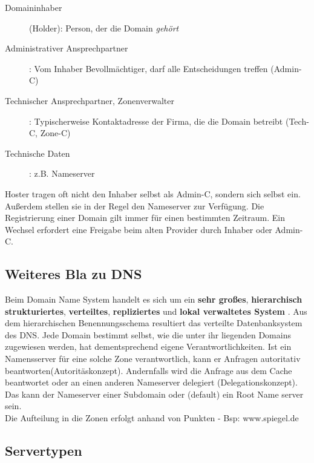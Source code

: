 \documentclass{article} %
\begin{document}
\begin{description}
	\item[Domaininhaber](Holder): Person, der die Domain \emph{gehört}
	\item[Administrativer Ansprechpartner]: Vom Inhaber Bevollmächtiger, darf alle Entscheidungen treffen (Admin-C)
	\item[Technischer Ansprechpartner, Zonenverwalter]: Typischerweise Kontaktadresse der Firma, die die Domain betreibt (Tech-C, Zone-C)
	\item [Technische Daten]: z.B. Nameserver
\end{description}

Hoster tragen oft nicht den Inhaber selbst als Admin-C, sondern sich selbst ein.
Außerdem stellen sie in der Regel den Nameserver zur Verfügung.
Die Registrierung einer Domain gilt immer für einen bestimmten Zeitraum.
Ein Wechsel erfordert eine Freigabe beim alten Provider durch Inhaber oder Admin-C.

\subsection{Weiteres Bla zu DNS}

Beim Domain Name System handelt es sich um ein \textbf{sehr großes}, \textbf{hierarchisch strukturiertes}, \textbf{verteiltes}, \textbf{repliziertes} und \textbf{lokal verwaltetes System} \cite{rfc1034,rfc1035}.
Aus dem hierarchischen Benennungsschema resultiert das verteilte Datenbanksystem des DNS.
Jede Domain bestimmt selbst, wie die unter ihr liegenden Domains zugewiesen werden, hat dementsprechend eigene Verantwortlichkeiten.
Ist ein Namensserver für eine solche Zone verantwortlich, kann er Anfragen autoritativ beantworten(Autoritäskonzept).
Andernfalls wird die Anfrage aus dem Cache beantwortet oder an einen anderen Nameserver delegiert (Delegationskonzept).
Das kann der Nameserver einer Subdomain oder (default) ein Root Name server sein.\\
Die Aufteilung in die Zonen erfolgt anhand von Punkten - Bsp: www.spiegel.de

\subsection{Servertypen}
\end{document}

